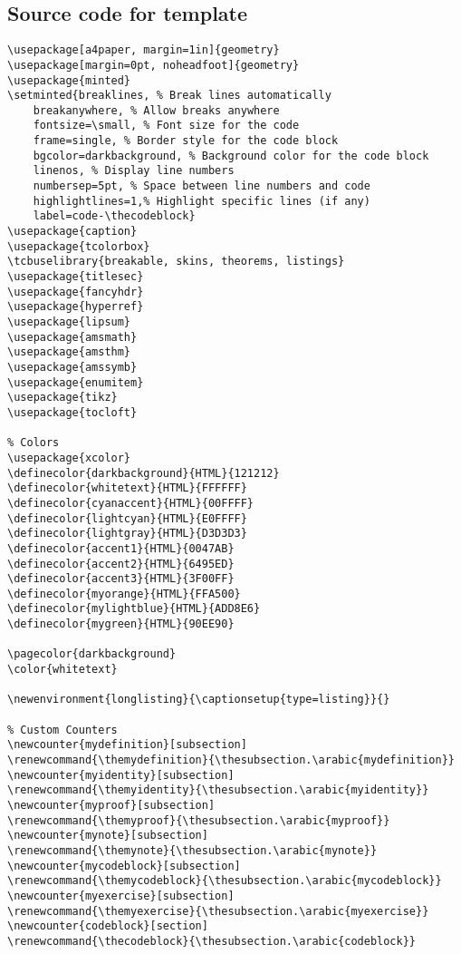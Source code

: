 \documentclass[openany]{book}
\begin{document}
\subsection{Source code for template}
\begin{longlisting}
\begin{verbatim}
\usepackage[a4paper, margin=1in]{geometry}
\usepackage[margin=0pt, noheadfoot]{geometry}
\usepackage{minted}
\setminted{breaklines, % Break lines automatically
    breakanywhere, % Allow breaks anywhere
    fontsize=\small, % Font size for the code
    frame=single, % Border style for the code block
    bgcolor=darkbackground, % Background color for the code block
    linenos, % Display line numbers
    numbersep=5pt, % Space between line numbers and code
    highlightlines=1,% Highlight specific lines (if any)
    label=code-\thecodeblock}
\usepackage{caption}
\usepackage{tcolorbox}
\tcbuselibrary{breakable, skins, theorems, listings}
\usepackage{titlesec}
\usepackage{fancyhdr}
\usepackage{hyperref}
\usepackage{lipsum}
\usepackage{amsmath}
\usepackage{amsthm}
\usepackage{amssymb}
\usepackage{enumitem}
\usepackage{tikz}
\usepackage{tocloft}

% Colors
\usepackage{xcolor}
\definecolor{darkbackground}{HTML}{121212}
\definecolor{whitetext}{HTML}{FFFFFF}
\definecolor{cyanaccent}{HTML}{00FFFF}
\definecolor{lightcyan}{HTML}{E0FFFF}
\definecolor{lightgray}{HTML}{D3D3D3}
\definecolor{accent1}{HTML}{0047AB}
\definecolor{accent2}{HTML}{6495ED}
\definecolor{accent3}{HTML}{3F00FF}
\definecolor{myorange}{HTML}{FFA500}
\definecolor{mylightblue}{HTML}{ADD8E6}
\definecolor{mygreen}{HTML}{90EE90}

\pagecolor{darkbackground}
\color{whitetext}

\newenvironment{longlisting}{\captionsetup{type=listing}}{}

% Custom Counters
\newcounter{mydefinition}[subsection]
\renewcommand{\themydefinition}{\thesubsection.\arabic{mydefinition}}
\newcounter{myidentity}[subsection]
\renewcommand{\themyidentity}{\thesubsection.\arabic{myidentity}}
\newcounter{myproof}[subsection]
\renewcommand{\themyproof}{\thesubsection.\arabic{myproof}}
\newcounter{mynote}[subsection]
\renewcommand{\themynote}{\thesubsection.\arabic{mynote}}
\newcounter{mycodeblock}[subsection]
\renewcommand{\themycodeblock}{\thesubsection.\arabic{mycodeblock}}
\newcounter{myexercise}[subsection]
\renewcommand{\themyexercise}{\thesubsection.\arabic{myexercise}}
\newcounter{codeblock}[section]
\renewcommand{\thecodeblock}{\thesubsection.\arabic{codeblock}}



\end{verbatim}
\end{longlisting}
\end{document}
